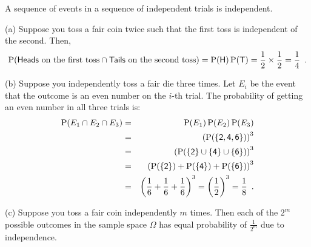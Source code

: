 \begin{example}\label{EX:SStsExs}
A sequence of events in a sequence of independent trials is independent.
\be

\item[(a)] Suppose you toss a fair coin twice such that the first toss is independent of the second.  Then,
$$
\P(\mathsf{Heads} \text{ on the first toss} \cap \mathsf{Tails} \text{ on the second toss} ) = \P(\mathsf{H}) \P(\mathsf{T}) = \frac{1}{2} \times \frac{1}{2}= \frac{1}{4} \enspace .
$$

\item[(b)] Suppose you independently toss a fair die three times.  Let $E_i$ be the event that the outcome is an even number on the $i$-th trial.  The probability of getting an even number in all three trials is:
\begin{eqnarray*}
\P(E_1 \cap E_2 \cap E_3)
&=& \P(E_1) \P(E_2) \P(E_3)\\
&=& \left(\P(\{\mathsf{2,4,6}\})\right)^3\\
&=& \left(\P(\{\mathsf{2}\} \cup \{\mathsf{4}\} \cup \{\mathsf{6}\}) \right)^3 \\
&=& \left(\P(\{\mathsf{2}\}) + \P(\{\mathsf{4}\}) + \P(\{\mathsf{6}\})\right)^3\\
&=& \left(\frac{1}{6} + \frac{1}{6} + \frac{1}{6} \right)^3 
= \left(\frac{1}{2} \right)^3
= \frac{1}{8} \enspace .
\end{eqnarray*}

\item[(c)]Suppose you toss a fair coin independently $m$ times.  Then each of the $2^m$ possible outcomes in the sample space $\Omega$ has equal probability of $\frac{1}{2^m}$ due to independence.
\ee
\end{example}

